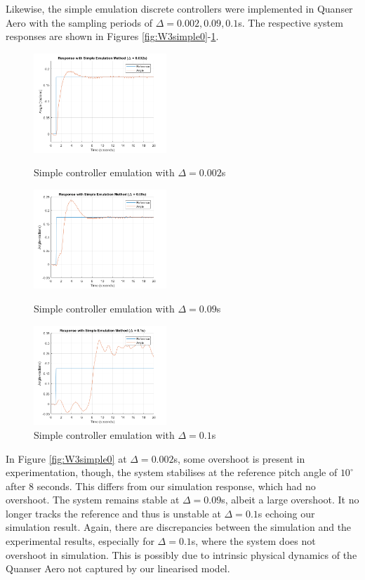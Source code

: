 \documentclass[11pt]{article}
\begin{document}
Likewise, the simple emulation discrete controllers were implemented in Quanser Aero with the sampling periods of $\Delta = 0.002, 0.09, 0.1$s. The respective system responses are shown in Figures \ref{fig:W3simple0}-\ref{fig:W3simple2}. 
\begin{figure}[H]
\begin{minipage}{.3\textwidth}
    \centering
    \includegraphics[width=5cm]{plots/Simple.png}
    \caption{Simple controller emulation with $\Delta = 0.002$s}
    \label{fig:W3simple0}
\end{minipage}
\hspace{0.5cm}
\begin{minipage}{.3\textwidth}
    \centering
    \includegraphics[width=5cm]{plots/Simple_0_09.png}
    \caption{\small{Simple controller emulation with $\Delta = 0.09$s}}
    \label{fig:W3simple1}
\end{minipage}
\hspace{0.5cm}
\begin{minipage}{.3\textwidth}
    \centering
    \includegraphics[width=5cm]{plots/Simple_0_1.png}
    \caption{\small{Simple controller emulation with $\Delta = 0.1$s}}
    \label{fig:W3simple2}
\end{minipage}
\end{figure}
In Figure \ref{fig:W3simple0} at $\Delta = 0.002$s, some overshoot is present in experimentation, though, the system stabilises at the reference pitch angle of $10^{\circ}$ after 8 seconds. This differs from our simulation response, which had no overshoot. The system remains stable at $\Delta = 0.09$s, albeit a large overshoot. It no longer tracks the reference and thus is unstable at $\Delta = 0.1$s echoing our simulation result. Again, there are discrepancies between the simulation and the experimental results, especially for $\Delta = 0.1$s, where the system does not overshoot in simulation. This is possibly due to intrinsic physical dynamics of the Quanser Aero not captured by our linearised model. 
\end{document}
